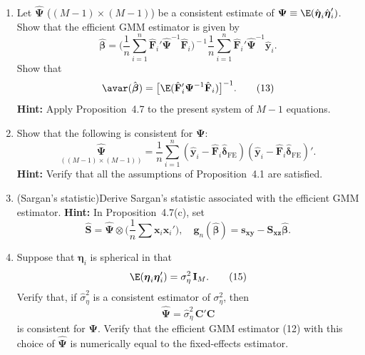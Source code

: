 \begin{problemset}
\begin{enumerate}[label=(\alph*)]
\item Let $\hat{\boldsymbol{\Psi}}$ ($(M-1) \times (M-1)$) be a consistent estimate of
  $\boldsymbol{\Psi} \equiv \E(\hat{\boldsymbol{\eta}}_i\hat{\boldsymbol{\eta}}_i')$. Show
  that the efficient GMM estimator is given by
  \begin{equation}
    \hat{\boldsymbol{\beta}} = \biggl(\frac{1}{n}\sum_{i=1}^{n}\hat{\mathbf{F}}_i'
    \hat{\boldsymbol{\Psi}}^{-1}\hat{\mathbf{F}}_i\biggr)^{\!-1}
    \frac{1}{n}\sum_{i=1}^{n}\hat{\mathbf{F}}_i'\hat{\boldsymbol{\Psi}}^{-1}\hat{\mathbf{y}}_i. \tag{12}
  \end{equation}
  Show that
  \begin{equation}
    \avar(\hat{\boldsymbol{\beta}})
    = \bigl[\E(\hat{\mathbf{F}}_i'\boldsymbol{\Psi}^{-1}\hat{\mathbf{F}}_i)\bigr]^{-1}. \tag{13}
  \end{equation}
  \textbf{Hint:} Apply Proposition~4.7 to the present system of $M - 1$ equations.

\item Show that the following is consistent for $\boldsymbol{\Psi}$:
  \begin{equation}
    \underset{((M-1) \times (M-1))}{\hat{\boldsymbol{\Psi}}}
    = \frac{1}{n}\sum_{i=1}^{n}
    (\hat{\mathbf{y}}_i - \hat{\mathbf{F}}_i\hat{\boldsymbol{\delta}}_{\text{FE}})
    (\hat{\mathbf{y}}_i - \hat{\mathbf{F}}_i\hat{\boldsymbol{\delta}}_{\text{FE}})'. \tag{14}
  \end{equation}
  \textbf{Hint:} Verify that all the assumptions of Proposition~4.1 are satisfied.

\item (Sargan's statistic)\quad Derive Sargan's statistic associated with the efficient
  GMM estimator. \textbf{Hint:} In Proposition~4.7(c), set
  \begin{equation}
    \hat{\mathbf{S}} = \hat{\boldsymbol{\Psi}} \otimes
    \biggl(\frac{1}{n}\sum \mathbf{x}_i\mathbf{x}_i'\biggr), \quad
    \mathbf{g}_n(\hat{\boldsymbol{\beta}})
    = \mathbf{s}_{\mathbf{xy}} - \mathbf{S}_{\mathbf{xz}}\hat{\boldsymbol{\beta}}.
  \end{equation}

\item Suppose that $\boldsymbol{\eta}_i$ is spherical in that
  \begin{equation}
    \E(\boldsymbol{\eta}_i\boldsymbol{\eta}_i') = \sigma_\eta^2\,\mathbf{I}_M. \tag{15}
  \end{equation}
  Verify that, if $\hat{\sigma}_\eta^2$ is a consistent estimator of $\sigma_\eta^2$, then
  \begin{equation}
    \hat{\boldsymbol{\Psi}} = \hat{\sigma}_\eta^2\,\mathbf{C}'\mathbf{C} \tag{16}
  \end{equation}
  is consistent for $\boldsymbol{\Psi}$. Verify that the efficient GMM estimator (12) with this
  choice of $\hat{\boldsymbol{\Psi}}$ is numerically equal to the fixed-effects estimator.


\end{enumerate}
\end{problemset}
